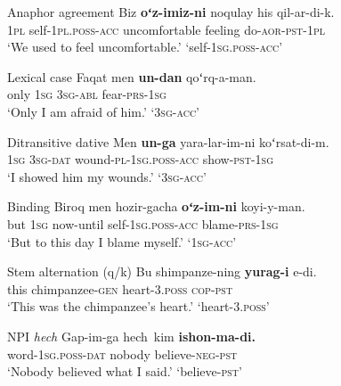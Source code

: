 \begin{exe}
\ex\label{ex:anaphor_agreement} Anaphor agreement
\gll Biz \textbf{oʻz-imiz-ni} noqulay his qil-ar-di-k.\\
\textsc{1pl} self-\textsc{1pl}.\textsc{poss}-\textsc{acc} uncomfortable feeling do-\textsc{aor}-\textsc{pst}-\textsc{1pl}\\
\glt `We used to feel uncomfortable.' \hfill {} `self-\textsc{1sg}.\textsc{poss}-\textsc{acc}'
\end{exe}
\begin{exe}
\ex\label{ex:lexical_case} Lexical case
\gll Faqat men \textbf{un-dan} qoʻrq-a-man.\\
only \textsc{1sg} \textsc{3sg}-\textsc{abl} fear-\textsc{prs}-\textsc{1sg}\\
\glt `Only I am afraid of him.' \hfill {} `\textsc{3sg}-\textsc{acc}'
\end{exe}
\begin{exe}
\ex\label{ex:ditransitive_dative} Ditransitive dative
\gll Men \textbf{un-ga} yara-lar-im-ni koʻrsat-di-m.\\
\textsc{1sg} \textsc{3sg}-\textsc{dat} wound-\textsc{pl}-\textsc{1sg}.\textsc{poss}-\textsc{acc} show-\textsc{pst}-\textsc{1sg}\\
\glt `I showed him my wounds.' \hfill {} `\textsc{3sg}-\textsc{acc}'
\end{exe}
\begin{exe}
\ex\label{ex:binding} Binding
\gll Biroq men hozir-gacha \textbf{oʻz-im-ni} koyi-y-man.\\
but \textsc{1sg} now-until self-\textsc{1sg}.\textsc{poss}-\textsc{acc} blame-\textsc{prs}-\textsc{1sg}\\
\glt `But to this day I blame myself.' \hfill {} `\textsc{1sg}-\textsc{acc}'
\end{exe}
\begin{exe}
\ex\label{ex:stem_alternation} Stem alternation (q/k)
\gll Bu shimpanze-ning \textbf{yurag-i} e-di.\\
this chimpanzee-\textsc{gen} heart-3.\textsc{poss} \textsc{cop}-\textsc{pst}\\
\glt `This was the chimpanzee's heart.' \hfill {} `heart-3.\textsc{poss}'
\end{exe}
\begin{exe}
\ex\label{ex:npi_hech} NPI \textit{hech}
\gll Gap-im-ga hech~kim \textbf{ishon-ma-di.}\\
word-\textsc{1sg}.\textsc{poss}-\textsc{dat} nobody believe-\textsc{neg}-\textsc{pst}\\
\glt `Nobody believed what I said.' \hfill {} `believe-\textsc{pst}'
\end{exe}
